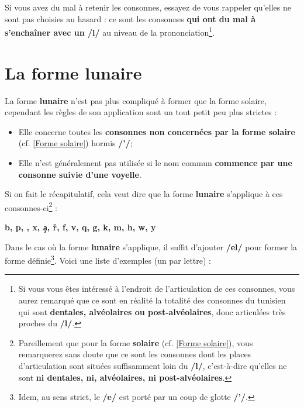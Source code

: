Si vous avez du mal à retenir les consonnes, essayez de vous rappeler qu'elles ne sont pas choisies au hasard : ce sont les consonnes \textbf{qui ont du mal à s'enchaîner avec un /l/} au niveau de la prononciation\footnote{Si vous vous êtes intéressé à l'endroit de l'articulation de ces consonnes, vous aurez remarqué que ce sont en réalité la totalité des consonnes du tunisien qui sont \textbf{dentales, alvéolaires ou post-alvéolaires}, donc articulées très proches du \textbf{/l/}.}.

\section{La forme lunaire}
\label{Forme lunaire}
La forme \textbf{lunaire} n'est pas plus compliqué à former que la forme solaire, cependant les règles de son application sont un tout petit peu plus strictes : 
\begin{itemize}
    \item Elle concerne toutes les \textbf{consonnes non concernées par la forme solaire} (cf. \ref{Forme solaire}) hormis \textbf{/'/};
    \item Elle n'est généralement pas utilisée si le nom commun \textbf{commence par une consonne suivie d'une voyelle}.
\end{itemize}

Si on fait le récapitulatif, cela veut dire que la forme \textbf{lunaire} s'applique à ces consonnes-ci\footnote{Pareillement que pour la forme \textbf{solaire} (cf. \ref{Forme solaire}), vous remarquerez sans doute que ce sont les consonnes dont les places d'articulation sont situées suffisamment loin du \textbf{/l/}, c'est-à-dire qu'elles ne sont \textbf{ni dentales, ni, alvéolaires, ni post-alvéolaires}.} : 

\begin{center}
    \textbf{
    b, p, \textcrh, x, \c{a}, \v{r}, f, v, q, g, k, m, h, w, y
    }
\end{center}

Dans le cas où la forme \textbf{lunaire} s'applique, il suffit d'ajouter \textbf{/el/} pour former la forme définie\footnote{Idem, au sens strict, le \textbf{/e/} est porté par un coup de glotte \textbf{/'/}.}. Voici une liste d'exemples (un par lettre) :

